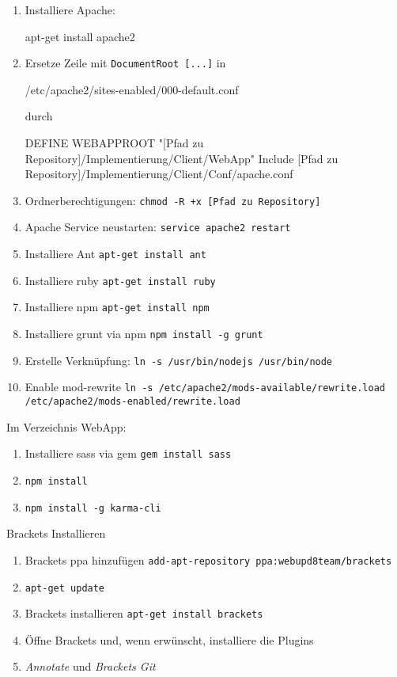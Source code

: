 \begin{enumerate}
	\item Installiere Apache: 	
	\begin{json}
		apt-get install apache2 
	\end{json}
	\item Ersetze Zeile mit \texttt{DocumentRoot [...]} in 
		\begin{json}
			/etc/apache2/sites-enabled/000-default.conf
		\end{json}
	durch
	
	\begin{json}
	DEFINE WEBAPPROOT "[Pfad zu Repository]/Implementierung/Client/WebApp"
	Include [Pfad zu Repository]/Implementierung/Client/Conf/apache.conf 
	\end{json}

	\setcounter{enumi}{2}
	\item Ordnerberechtigungen: \texttt{chmod -R +x [Pfad zu Repository] }
	\item Apache Service neustarten: \texttt{service apache2 restart}
	\item Installiere Ant \texttt{apt-get install ant}
	\item Installiere ruby \texttt{apt-get install ruby}
	\item Installiere npm \texttt{apt-get install npm}
	\item Installiere grunt via npm \texttt{npm install -g grunt}
	\item Erstelle Verknüpfung: \texttt{ln -s /usr/bin/nodejs /usr/bin/node}
	\item Enable mod-rewrite \texttt{ln -s /etc/apache2/mods-available/rewrite.load /etc/apache2/mods-enabled/rewrite.load}
\end{enumerate}
Im Verzeichnis WebApp:
\begin{enumerate}
	\item Installiere sass via gem \texttt{gem install sass}
	\item \texttt{npm install}
	\item \texttt{npm install -g karma-cli}
\end{enumerate}
Brackets Installieren
\begin{enumerate}
	\item Brackets ppa hinzufügen \texttt{add-apt-repository ppa:webupd8team/brackets}
	\item \texttt{apt-get update}
	\item Brackets installieren \texttt{apt-get install brackets}
	\item Öffne Brackets und, wenn erwünscht, installiere die Plugins 
	\item \textit{Annotate} und \textit{Brackets Git}		
\end{enumerate}
